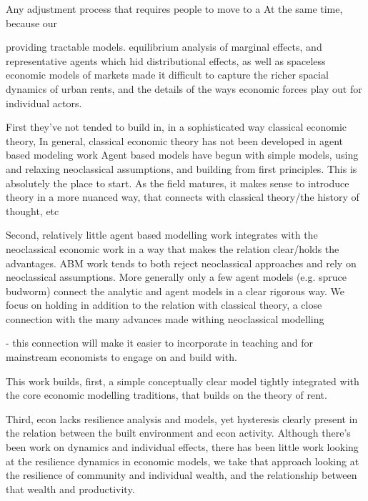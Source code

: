 Any adjustment process that requires people to move to a 
At the same time, because our  

providing tractable models.  equilibrium analysis of marginal effects, and representative agents which hid distributional effects, as well as spaceless economic models of markets made it difficult to capture the richer spacial dynamics of urban rents, and the details of the ways economic forces play out for individual actors.

First they've not tended to build in, in a sophisticated way classical economic theory,
In general, classical economic theory has not been developed in agent based modeling work
Agent based models have begun with simple models, using and relaxing neoclassical assumptions, and building from first principles. This is absolutely the place to start. As the field matures, it makes sense to introduce theory in a more nuanced way, that connects with classical theory/the history of thought, etc

Second, relatively little agent based modelling work integrates with the neoclassical economic work in a way that makes the relation clear/holds the advantages. ABM work tends to both reject neoclassical approaches and rely on neoclassical assumptions.
More generally only a few agent models (e.g. spruce budworm) connect the analytic and agent models in a clear rigorous way. We focus on holding in addition to the relation with classical theory, a close connection with the many advances made withing neoclassical modelling

- this connection will make it easier to incorporate in teaching and for mainstream economists to engage on and build with.

This work builds, first, a simple conceptually clear model tightly integrated with the core economic modelling traditions, that builds on the theory of rent.


Third, econ lacks resilience analysis and models, yet hysteresis clearly present in the relation between the built environment and econ activity. Although there's been work on dynamics and individual effects, there has been little work looking at the resilience dynamics in economic models, we take that approach looking at the resilience of community and individual wealth, and the relationship between that wealth and productivity. 

